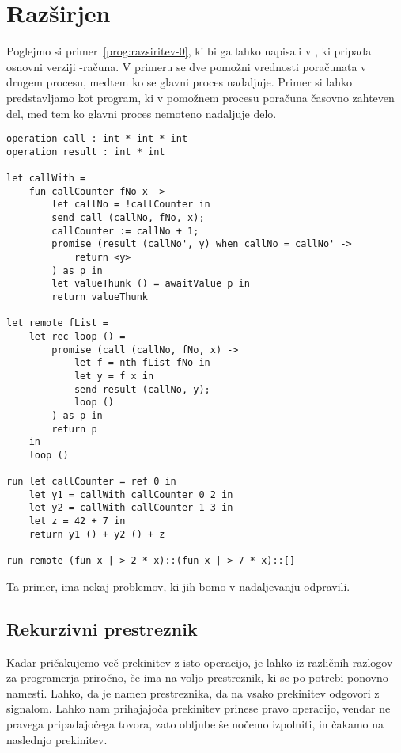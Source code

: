 \section{Razširjen \lae{}}\label{sec:razsirjen-lae}

Poglejmo si primer~\ref{prog:razsiritev-0}, ki bi ga lahko napisali v \aeff{}, ki pripada osnovni verziji \lae{}\nobreakdash-računa. V primeru se dve pomožni vrednosti poračunata v drugem procesu, medtem ko se glavni proces nadaljuje. 
Primer si lahko predstavljamo kot program, ki v pomožnem procesu poračuna časovno zahteven del, med tem ko glavni proces nemoteno nadaljuje delo.

\begin{lstlisting}[caption={Računanje zahtevne funkcije v ozadju.},label={prog:razsiritev-0},float,floatplacement=h]
operation call : int * int * int
operation result : int * int

let callWith =
	fun callCounter fNo x ->
		let callNo = !callCounter in
		send call (callNo, fNo, x);
		callCounter := callNo + 1;
		promise (result (callNo', y) when callNo = callNo' ->
			return <y>
		) as p in
		let valueThunk () = awaitValue p in
		return valueThunk

let remote fList =
	let rec loop () =
		promise (call (callNo, fNo, x) ->
			let f = nth fList fNo in
			let y = f x in
			send result (callNo, y);
			loop ()
		) as p in
		return p
	in
	loop ()

run	let callCounter = ref 0 in
	let y1 = callWith callCounter 0 2 in
	let y2 = callWith callCounter 1 3 in
	let z = 42 + 7 in
	return y1 () + y2 () + z

run remote (fun x |-> 2 * x)::(fun x |-> 7 * x)::[]
\end{lstlisting}

Ta primer, ima nekaj problemov, ki jih bomo v nadaljevanju odpravili.


\subsection{Rekurzivni prestreznik}


Kadar pričakujemo več prekinitev z isto operacijo, je lahko iz različnih razlogov za programerja priročno, če ima na voljo prestreznik, ki se po potrebi ponovno namesti. Lahko, da je namen prestreznika, da na vsako prekinitev odgovori z signalom. Lahko nam prihajajoča prekinitev prinese pravo operacijo, vendar ne pravega pripadajočega tovora, zato obljube še nočemo izpolniti, in čakamo na naslednjo prekinitev.

